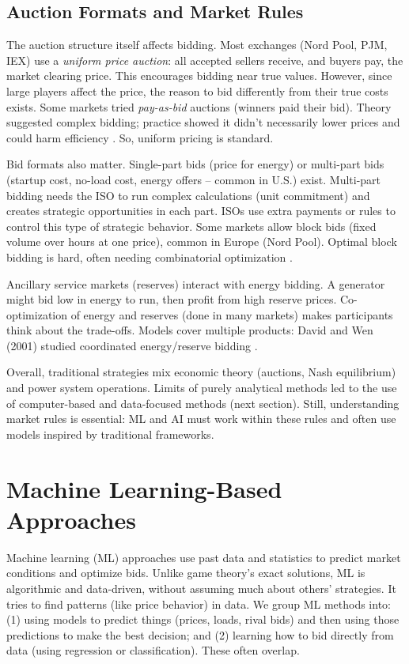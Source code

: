 \documentclass[conference]{IEEEtran}
\begin{document}
\subsection{Auction Formats and Market Rules}

The auction structure itself affects bidding. Most exchanges (Nord Pool, PJM, IEX) use a \textit{uniform price auction}: all accepted sellers receive, and buyers pay, the market clearing price. This encourages bidding near true values. However, since large players affect the price, the reason to bid differently from their true costs exists. Some markets tried \textit{pay-as-bid} auctions (winners paid their bid). Theory suggested complex bidding; practice showed it didn't necessarily lower prices and could harm efficiency \cite{FedericoRahman2003}. So, uniform pricing is standard.

Bid formats also matter. Single-part bids (price for energy) or multi-part bids (startup cost, no-load cost, energy offers – common in U.S.) exist. Multi-part bidding needs the ISO to run complex calculations (unit commitment) and creates strategic opportunities in each part. ISOs use extra payments or rules to control this type of strategic behavior. Some markets allow block bids (fixed volume over hours at one price), common in Europe (Nord Pool). Optimal block bidding is hard, often needing combinatorial optimization \cite{Ugedo2006}.

Ancillary service markets (reserves) interact with energy bidding. A generator might bid low in energy to run, then profit from high reserve prices. Co-optimization of energy and reserves (done in many markets) makes participants think about the trade-offs. Models cover multiple products: David and Wen (2001) studied coordinated energy/reserve bidding \cite{David2001b}.

Overall, traditional strategies mix economic theory (auctions, Nash equilibrium) and power system operations. Limits of purely analytical methods led to the use of computer-based and data-focused methods (next section). Still, understanding market rules is essential: ML and AI must work within these rules and often use models inspired by traditional frameworks.

\section{Machine Learning-Based Approaches}

Machine learning (ML) approaches use past data and statistics to predict market conditions and optimize bids. Unlike game theory's exact solutions, ML is algorithmic and data-driven, without assuming much about others' strategies. It tries to find patterns (like price behavior) in data. We group ML methods into: (1) using models to predict things (prices, loads, rival bids) and then using those predictions to make the best decision; and (2) learning how to bid directly from data (using regression or classification). These often overlap.
\end{document}
